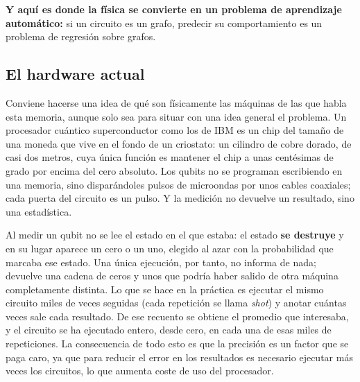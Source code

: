 \textbf{Y aquí es donde la física se convierte en un problema de aprendizaje automático:} si
un circuito es un grafo, predecir su comportamiento es un problema de regresión sobre
grafos.


\subsection{El hardware actual}
\label{sec:hardware}

Conviene hacerse una idea de qué son físicamente las máquinas de las que habla esta
memoria, aunque solo sea para situar con una idea general el problema. Un procesador cuántico
superconductor como los de IBM es un chip del tamaño de una moneda que vive en el fondo de
un criostato: un cilindro de cobre dorado, de casi dos metros, cuya única función es
mantener el chip a unas centésimas de grado por encima del cero absoluto. Los qubits no se
programan escribiendo en una memoria, sino disparándoles pulsos de microondas por unos
cables coaxiales; cada puerta del circuito es un pulso. Y la medición no devuelve un
resultado, sino una estadística.

Al medir un qubit no
se lee el estado en el que estaba: el estado \textbf{se destruye} y en su lugar aparece un
cero o un uno, elegido al azar con la probabilidad que marcaba ese estado. Una única
ejecución, por tanto, no informa de nada; devuelve una cadena de ceros y unos que podría
haber salido de otra máquina completamente distinta. Lo que se hace en la práctica es
ejecutar el mismo circuito miles de veces seguidas (cada repetición se llama
\emph{shot}) y anotar cuántas veces sale cada resultado. De ese recuento se obtiene el
promedio que interesaba, y el circuito se ha ejecutado entero, desde cero, en cada una de
esas miles de repeticiones. La consecuencia de todo esto es que la precisión es un factor que se paga caro, ya que para reducir el error
en los resultados es necesario ejecutar más veces los circuitos, lo que aumenta coste de uso del procesador.

